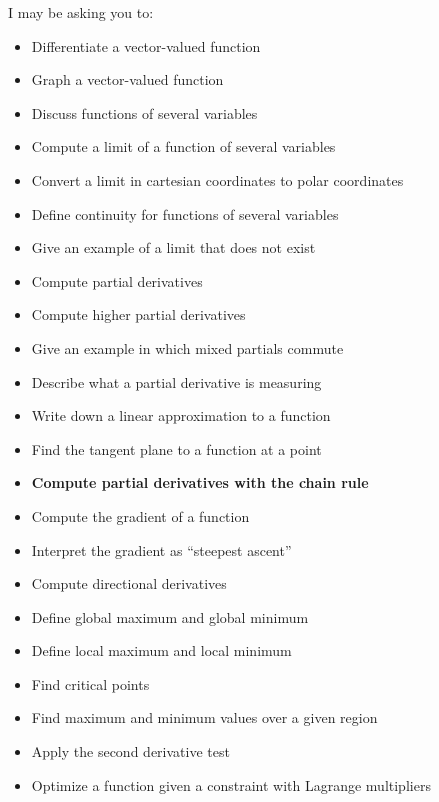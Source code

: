 \documentclass[12pt]{article}
\begin{document}
I may be asking you to:
\begin{multicols}{2}
\begin{itemize}
\item Differentiate a vector-valued function
\item Graph a vector-valued function
\item Discuss functions of several variables
\item Compute a limit of a function of several variables
\item Convert a limit in cartesian coordinates to polar coordinates
\item Define continuity for functions of several variables
\item Give an example of a limit that does not exist
\item Compute partial derivatives
\item Compute higher partial derivatives
\item Give an example in which mixed partials commute
\item Describe what a partial derivative is measuring
\item Write down a linear approximation to a function
\item Find the tangent plane to a function at a point
\item \textbf{Compute partial derivatives with the chain rule}
\item Compute the gradient of a function
\item Interpret the gradient as ``steepest ascent''
\item Compute directional derivatives
\item Define global maximum and global minimum
\item Define local maximum and local minimum
\item Find critical points
\item Find maximum and minimum values over a given region
\item Apply the second derivative test
\item Optimize a function given a constraint with Lagrange multipliers
\end{itemize}
\end{multicols}
\end{document}
